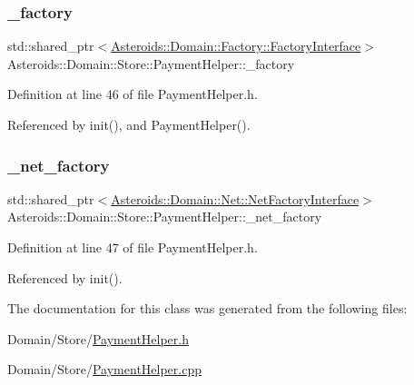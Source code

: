 \subsubsection{\texorpdfstring{\+\_\+factory}{\_factory}}
{\footnotesize\ttfamily std\+::shared\+\_\+ptr$<$\hyperlink{classAsteroids_1_1Domain_1_1Factory_1_1FactoryInterface}{Asteroids\+::\+Domain\+::\+Factory\+::\+Factory\+Interface}$>$ Asteroids\+::\+Domain\+::\+Store\+::\+Payment\+Helper\+::\+\_\+factory\hspace{0.3cm}{\ttfamily [private]}}



Definition at line 46 of file Payment\+Helper.\+h.



Referenced by init(), and Payment\+Helper().

\mbox{\label{classAsteroids_1_1Domain_1_1Store_1_1PaymentHelper_adcd8cedaf305228ab6d938551f3fbef3}} 
\subsubsection{\texorpdfstring{\+\_\+net\+\_\+factory}{\_net\_factory}}
{\footnotesize\ttfamily std\+::shared\+\_\+ptr$<$\hyperlink{classAsteroids_1_1Domain_1_1Net_1_1NetFactoryInterface}{Asteroids\+::\+Domain\+::\+Net\+::\+Net\+Factory\+Interface}$>$ Asteroids\+::\+Domain\+::\+Store\+::\+Payment\+Helper\+::\+\_\+net\+\_\+factory\hspace{0.3cm}{\ttfamily [private]}}



Definition at line 47 of file Payment\+Helper.\+h.



Referenced by init().



The documentation for this class was generated from the following files\+:\begin{DoxyCompactItemize}
\item 
Domain/\+Store/\hyperlink{PaymentHelper_8h}{Payment\+Helper.\+h}\item 
Domain/\+Store/\hyperlink{PaymentHelper_8cpp}{Payment\+Helper.\+cpp}\end{DoxyCompactItemize}
